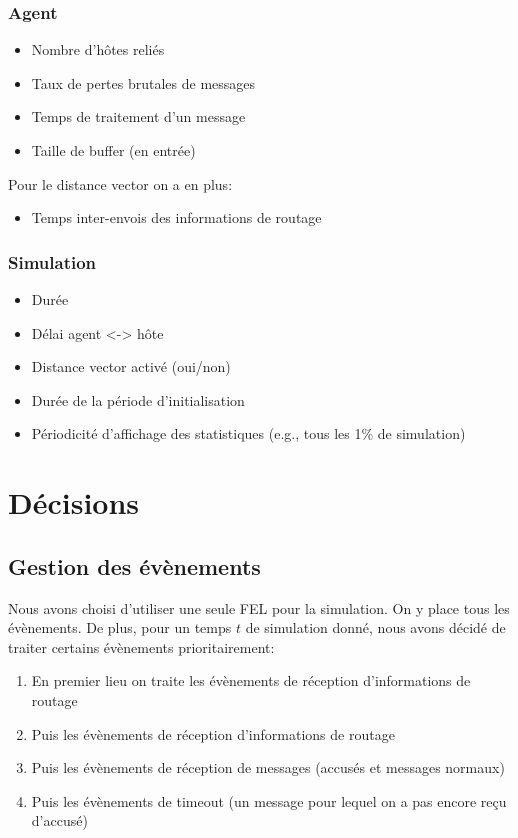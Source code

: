 \documentclass[a4paper,11pt]{article}
\begin{document}
\subsubsection{Agent}

\begin{itemize}
 \item Nombre d'hôtes reliés
 \item Taux de pertes brutales de messages
 \item Temps de traitement d'un message
 \item Taille de buffer (en entrée)
\end{itemize}

Pour le distance vector on a en plus:
\begin{itemize}
 \item Temps inter-envois des informations de routage
\end{itemize}

\subsubsection{Simulation}
\begin{itemize}
 \item Durée
 \item Délai agent <-> hôte
 \item Distance vector activé (oui/non)
 \item Durée de la période d'initialisation
 \item Périodicité d'affichage des statistiques (e.g., tous les 1\% de simulation)
\end{itemize}



\section{Décisions}

\subsection{Gestion des évènements}
Nous avons choisi d'utiliser une seule FEL pour la simulation. On y place tous les évènements. De plus, pour un temps $t$ de simulation donné, nous avons décidé de traiter certains évènements prioritairement:

\begin{enumerate}
 \item En premier lieu on traite les évènements de réception d'informations de routage
 \item Puis les évènements de réception d'informations de routage
 \item Puis les évènements de réception de messages (accusés et messages normaux)
 \item Puis les évènements de timeout (un message pour lequel on a pas encore reçu d'accusé)
\end{enumerate}
\end{document}
